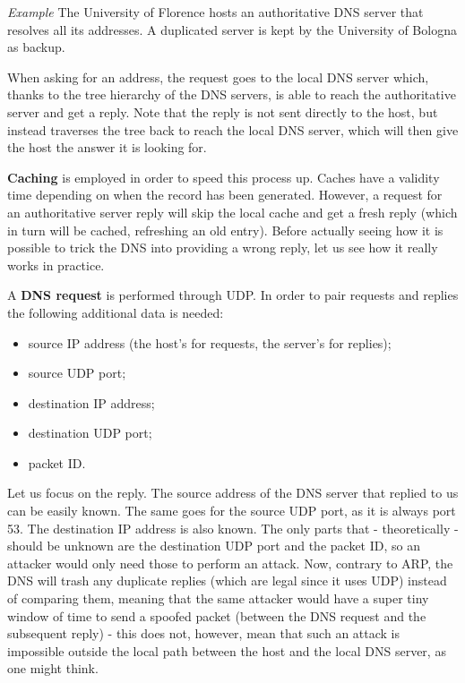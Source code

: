 \vspace{0.5em}

\emph{Example} The University of Florence hosts an authoritative DNS server that resolves all its addresses. A duplicated server is kept by the University of Bologna as backup.

\vspace{0.5em}

When asking for an address, the request goes to the local DNS server which, thanks to the tree hierarchy of the DNS servers, is able to reach the authoritative server and get a reply. Note that the reply is not sent directly to the host, but instead traverses the tree back to reach the local DNS server, which will then give the host the answer it is looking for.

\textbf{Caching} is employed in order to speed this process up. Caches have a validity time depending on when the record has been generated. However, a request for an authoritative server reply will skip the local cache and get a fresh reply (which in turn will be cached, refreshing an old entry). Before actually seeing how it is possible to trick the DNS into providing a wrong reply, let us see how it really works in practice.

A \textbf{DNS request} is performed through UDP. In order to pair requests and replies the following additional data is needed:

\begin{itemize}
	\item source IP address (the host’s for requests, the server’s for replies);
	\item source UDP port;
	\item destination IP address;
	\item destination UDP port;
	\item packet ID.
\end{itemize}

Let us focus on the reply. The source address of the DNS server that replied to us can be easily known. The same goes for the source UDP port, as it is always port 53. The destination IP address is also known. The only parts that - theoretically - should be unknown are the destination UDP port and the packet ID, so an attacker would only need those to perform an attack. Now, contrary to ARP, the DNS will trash any duplicate replies (which are legal since it uses UDP) instead of comparing them, meaning that the same attacker would have a super tiny window of time to send a spoofed packet (between the DNS request and the subsequent reply) - this does not, however, mean that such an attack is impossible outside the local path between the host and the local DNS server, as one might think.

